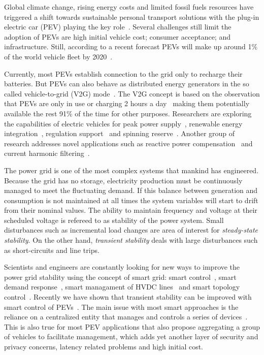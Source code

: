 \documentclass[final,12pt]{elsarticle}
\begin{document}
Global climate change, rising energy costs and limited fossil fuels resources have triggered a shift towards sustainable personal transport solutions with the plug-in electric car (PEV) playing the key role~\cite{penna2014climate,}. Several challenges still limit the adoption of PEVs are high initial vehicle cost; consumer acceptance; and infrastructure. Still, according to a recent forecast  PEVs  will make up around 1\% of the world vehicle fleet by 2020~\cite{duan2014forecasting}.

Currently, most PEVs establish connection to the grid only to recharge their batteries. But PEVs can also behave as distributed energy generators in the so called vehicle-to-grid (V2G) mode~\cite{kempton2001vehicle}. The V2G concept is based on the observation that PEVs are only in use or charging 2 hours a day~\cite{pearre2011electric} making them potentially available the rest 91\% of the time for other purposes. Researchers are exploring the capabilities of electric vehicles for peak power supply~\cite{drude2014photovoltaics,pang2012bevs}, renewable energy integration~\cite{han2014development,mwasilu2014electric}, regulation support~\cite{sortomme2012intelligent,liu2013decentralized} and spinning reserve~\cite{ota2012autonomous,ehsani2012vehicle}. Another group of research addresses novel applications such as reactive power compensation~\cite{deilami2011real} and current harmonic filtering~\cite{sun2014unified}. 

The power grid is one of the most complex systems that mankind has engineered. Because the grid has no storage, electricity production must be continuously managed to meet the fluctuating demand. If this balance between generation and consumption is not maintained at all times the system variables will start to drift from their nominal values. The ability to maintain frequency and voltage 
at their scheduled voltage is refereed to as stability of the power system. Small disturbances such as incremental load changes are area of interest for \textit{steady-state stability}. On the other hand, \textit{transient stability} deals with large disturbances such as short-circuits and line trips.

Scientists and engineers are constantly looking for new ways to improve the power grid stability using the concept of smart grid: smart control~\cite{rueda2013hybrid,sofla2012control}, smart demand response~\cite{schafer2015decentral}, smart managament of HVDC lines~\cite{fuchs2013placement} and smart topology control~\cite{bruno2012controlling}. Recently we have shown that transient stability can be improved with smart control of PEVs~\cite{gajduk2014improving}.
The main issue with most smart approaches is the reliance on a centralized entity that manages and controls a series of devices~\cite{richardson2013electric}. This is also true for most PEV applications that also propose aggregating a group of vehicles to facilitate management, which adds yet another layer of security and privacy concerns, latency related problems and high initial cost.
\end{document}
